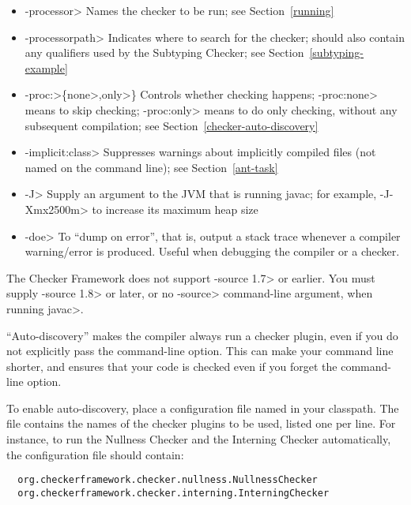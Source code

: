 \begin{itemize}
\item \<-processor> Names the checker to be
  run; see Section~\ref{running}
\item \<-processorpath> Indicates where to search for the
  checker; should also contain any qualifiers used by the Subtyping
  Checker; see Section~\ref{subtyping-example}
\item \<-proc:>\{\<none>,\<only>\} Controls whether checking
  happens; \<-proc:none>
  means to skip checking; \<-proc:only> means to do only
  checking, without any subsequent compilation; see
  Section~\ref{checker-auto-discovery}
\item \<-implicit:class> Suppresses warnings about implicitly compiled files
  (not named on the command line); see Section~\ref{ant-task}
\item \<-J> Supply an argument to the JVM that is running javac;
  for example, \<-J-Xmx2500m> to increase its maximum heap size
\item \<-doe> To ``dump on error'', that is, output a stack trace
  whenever a compiler warning/error is produced. Useful when debugging
  the compiler or a checker.
\end{itemize}

The Checker Framework does not support \<-source 1.7> or earlier.  You must
supply \<-source 1.8> or later, or no \<-source> command-line argument,
when running \<javac>.



``Auto-discovery'' makes the  compiler always run a checker
plugin, even if you do not explicitly pass the 
command-line option.  This can make your command line shorter, and ensures
that your code is checked even if you forget the command-line option.

\begin{sloppypar}
To enable auto-discovery, place a configuration file named
in your classpath.  The file contains the names of the checker plugins to
be used, listed one per line.  For instance, to run the Nullness Checker and the
Interning Checker automatically, the configuration file should contain:
\end{sloppypar}

\begin{smaller}
\begin{Verbatim}
  org.checkerframework.checker.nullness.NullnessChecker
  org.checkerframework.checker.interning.InterningChecker
\end{Verbatim}
\end{smaller}

